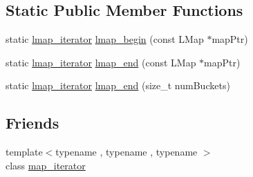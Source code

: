 \subsection*{Static Public Member Functions}
\begin{DoxyCompactItemize}
\item 
static \hyperlink{classshad_1_1lmap__iterator}{lmap\-\_\-iterator} \hyperlink{classshad_1_1lmap__iterator_a77957036c48c709283ed2ec98fe79e0d}{lmap\-\_\-begin} (const L\-Map $\ast$map\-Ptr)
\item 
static \hyperlink{classshad_1_1lmap__iterator}{lmap\-\_\-iterator} \hyperlink{classshad_1_1lmap__iterator_af884d9acfdcdc8eba8d6eb4330923f74}{lmap\-\_\-end} (const L\-Map $\ast$map\-Ptr)
\item 
static \hyperlink{classshad_1_1lmap__iterator}{lmap\-\_\-iterator} \hyperlink{classshad_1_1lmap__iterator_abb447d70c14ac1fb628a525a0db60dd9}{lmap\-\_\-end} (size\-\_\-t num\-Buckets)
\end{DoxyCompactItemize}
\subsection*{Friends}
\begin{DoxyCompactItemize}
\item 
{\footnotesize template$<$typename , typename , typename $>$ }\\class \hyperlink{classshad_1_1lmap__iterator_ae4a075e5a8191685a74f2d18b8cd8850}{map\-\_\-iterator}
\end{DoxyCompactItemize}


